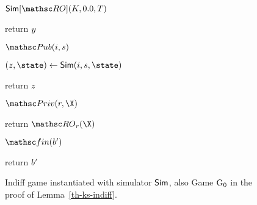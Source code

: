 \begin{figure}[tp]
\begin{minipage}[t]{0.49\textwidth}
\begin{oracle}{$\simulator[\RO](\hmackey, \hmactext, \rlookuptable)$}
			\item return $y$
		\end{oracle}
			\ExptSepSpace
	\begin{algorithm}{$\PubO(\simIndex,\simInString)$}
		\item $(z,\state) \gets \Sim(\simIndex,\simInString,\state)$
		\item return $z$
	\end{algorithm}
	\ExptSepSpace
	\begin{algorithm}{$\PrivO(\roIndex,\X)$}
		\item return $\RO_{\roIndex}(\X)$
	\end{algorithm}	
			\ExptSepSpace
	\begin{algorithm}{$\Finalize(b')$}
		\item return $b'$
	\end{algorithm}
		\end{minipage}
		\label{fig:gm0-ks-indiff}
		\caption{Indiff game instantiated with simulator $\mathsf{Sim}$, also Game $\textnormal{G}_0$ in the proof of Lemma~\ref{th-ks-indiff}.}
	\end{figure}

